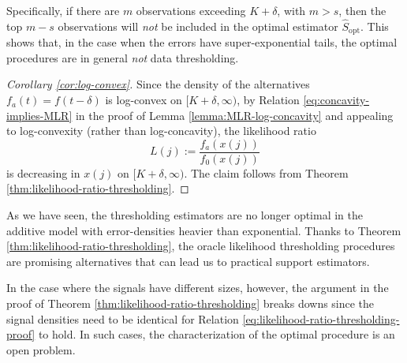 Specifically, if there are $m$ observations exceeding $K+\delta$, with $m>s$, then the top $m-s$ observations will \emph{not} be included in the optimal estimator $\widehat{S}_{\text{opt}}$. This shows that, in the case when the 
errors have super-exponential tails, the optimal procedures are in general \emph{not} data thresholding.

\begin{proof}[Corollary \ref{cor:log-convex}]
Since the density of the alternatives $f_{a}(t) = {f(t-\delta)}$ is log-convex on $[K+\delta, \infty)$, by Relation \eqref{eq:concavity-implies-MLR} in the proof of Lemma \ref{lemma:MLR-log-concavity} and appealing to log-convexity (rather than log-concavity), the likelihood ratio
$$
L(j) := \frac{f_a(x(j))}{f_0(x(j))} %
$$
is decreasing in $x(j)$ on $[K+\delta, \infty)$.  The claim follows from Theorem \ref{thm:likelihood-ratio-thresholding}.
\end{proof}

\begin{remark} As we have seen, the thresholding estimators are no longer optimal 
in the additive model with error-densities heavier than exponential.   Thanks to Theorem 
\ref{thm:likelihood-ratio-thresholding}, the oracle likelihood thresholding procedures are promising alternatives
that can lead us to practical support estimators.  

In the case where the signals have different sizes, however, the argument in the proof of Theorem \ref{thm:likelihood-ratio-thresholding} breaks downs since the signal densities need to be identical for Relation \eqref{eq:likelihood-ratio-thresholding-proof} to hold.  In such cases, the characterization of the optimal procedure is an open problem.
\end{remark}








